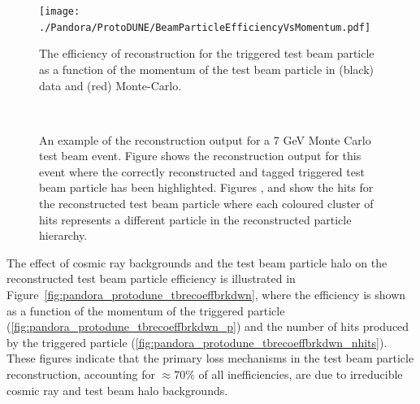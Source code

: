 \begin{figure}[!ht]
\centering
\texttt{[image: ./Pandora/ProtoDUNE/BeamParticleEfficiencyVsMomentum.pdf]}
\caption[Reconstruction efficiency for triggered test beam particle per particle momentum  and .]{The efficiency of reconstruction for the triggered test beam particle as a function of the momentum of the test beam particle in (black) data and (red) Monte-Carlo.}
\label{pandora_protodune_tbrecoeff}
\end{figure}

\begin{figure}[!ht]
\centering
{} \\ 
\caption[Pandora reconstruction output for \SI{7}{GeV}  test beam event]{An example of the  reconstruction output for a 7 GeV Monte Carlo test beam event.  Figure \protect{} shows the \threed reconstruction output for this event where the correctly reconstructed and tagged triggered test beam particle has been highlighted.  Figures \protect{}, \protect{} and \protect{} show the \twod hits for the reconstructed test beam particle where each coloured cluster of hits represents a different particle in the reconstructed particle hierarchy.}
\label{pandora_protodune_reco}
\end{figure}

The effect of cosmic ray backgrounds and the test beam particle halo on the reconstructed test beam particle efficiency is illustrated in Figure~\ref{fig:pandora_protodune_tbrecoeffbrkdwn}, where the efficiency is shown as a function of the momentum of the triggered particle (\ref{fig:pandora_protodune_tbrecoeffbrkdwn_p}) and the number of hits produced by the triggered particle (\ref{fig:pandora_protodune_tbrecoeffbrkdwn_nhits}).  These figures indicate that the primary loss mechanisms in the test beam particle reconstruction, accounting for $\approx 70\%$ of all inefficiencies, are due to irreducible cosmic ray and test beam halo backgrounds.

